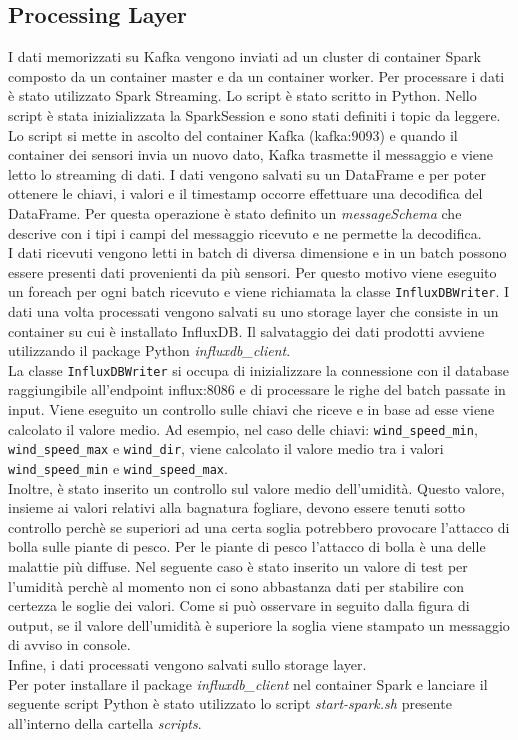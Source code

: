\documentclass{article}
\begin{document}
\subsection{Processing Layer}
I dati memorizzati su Kafka vengono inviati ad un cluster di container Spark composto da un container master e da un container worker. Per processare i dati è stato utilizzato Spark Streaming. Lo script è stato scritto in Python. Nello script è stata inizializzata la SparkSession e sono stati definiti i topic da leggere. Lo script si mette in ascolto del container Kafka (kafka:9093) e quando il container dei sensori invia un nuovo dato, Kafka trasmette il messaggio e viene letto lo streaming di dati. I dati vengono salvati su un DataFrame e per poter ottenere le chiavi, i valori e il timestamp occorre effettuare una decodifica del DataFrame. Per questa operazione è stato definito un \textit{messageSchema} che descrive con i tipi i campi del messaggio ricevuto e ne permette la decodifica.\\
I dati ricevuti vengono letti in batch di diversa dimensione e in un batch possono essere presenti dati provenienti da più sensori. Per questo motivo viene eseguito un foreach per ogni batch ricevuto e viene richiamata la classe \texttt{InfluxDBWriter}. I dati una volta processati vengono salvati su uno storage layer che consiste in un container su cui è installato InfluxDB. Il salvataggio dei dati prodotti avviene utilizzando il package Python \textit{influxdb\_client}.\\ 
La classe \texttt{InfluxDBWriter} si occupa di inizializzare la connessione con il database raggiungibile all'endpoint influx:8086 e di processare le righe del batch passate in input. Viene eseguito un controllo sulle chiavi che riceve e in base ad esse viene calcolato il valore medio. Ad esempio, nel caso delle chiavi: \texttt{wind\_speed\_min}, \texttt{wind\_speed\_max} e \texttt{wind\_dir}, viene calcolato il valore medio tra i valori \texttt{wind\_speed\_min} e \texttt{wind\_speed\_max}.\\
Inoltre, è stato inserito un controllo sul valore medio dell'umidità. Questo valore, insieme ai valori relativi alla bagnatura fogliare, devono essere tenuti sotto controllo perchè se superiori ad una certa soglia potrebbero provocare l'attacco di bolla sulle piante di pesco. Per le piante di pesco l'attacco di bolla è una delle malattie più diffuse. Nel seguente caso è stato inserito un valore di test per l'umidità perchè al momento non ci sono abbastanza dati per stabilire con certezza le soglie dei valori.
Come si può osservare in seguito dalla figura di output, se il valore dell'umidità è superiore la soglia viene stampato un messaggio di avviso in console. \\
Infine, i dati processati vengono salvati sullo storage layer.\\
Per poter installare il package \textit{influxdb\_client} nel container Spark e lanciare il seguente script Python è stato utilizzato lo script \textit{start-spark.sh} presente all'interno della cartella \textit{scripts}.
\end{document}
